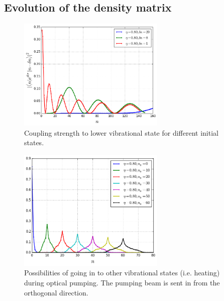 \documentclass[aps,twocolumn,secnumarabic,balancelastpage,amsmath,amssymb,nofootinbib]{revtex4}
\begin{document}
\subsection{Evolution of the density matrix}
\begin{figure}
  \begin{center}
    \includegraphics[width=7cm]{../raman_0.8_1.png}
  \end{center}
  \caption{Coupling strength to lower vibrational state for different initial states.}
  \label{fig-raman-curve}
\end{figure}
\begin{figure}
  \begin{center}
    \includegraphics[width=7cm]{../pump_0.8_0_curve.png}
  \end{center}
  \caption{Possibilities of going in to other vibrational states (i.e. heating) during optical pumping. The pumping beam is sent in from the orthogonal direction.}
  \label{fig-pump-curve}
\end{figure}
\end{document}
